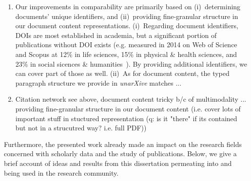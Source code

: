 \begin{enumerate}
\item Our improvements in comparability are primarily based on (i)~determining documents' unique identifiers, and (ii)~providing fine-granular structure in our document content representations. (i)~Regarding document identifiers, DOIs are most established in academia, but a significant portion of publications without DOI exists (e.g. 
measured in 2014 on Web of Science and Scopus at 12\% in life sciences, 15\% in physical \& health sciences, and 23\% in social sicences \& humanities~\cite{10.1016/j.joi.2015.11.008}).
By providing additional identifiers, we can cover part of those as well. (ii)~As for document content, the typed paragraph structure we provide in \textit{unarXive} matches ...
\item Citation network see above, document content tricky b/c of multimodality ... providing fine-granular structure in our document content (i.e. cover lots of important stuff in stuctured representation (q: is it "there" if its contained but not in a strucutred way? i.e. full PDF))
\end{enumerate}

Furthermore, the presented work already made an impact on the research fields concerned with scholarly data and the study of publications. Below, we give a brief account of ideas and results from this dissertation permeating into and being used in the research community.

